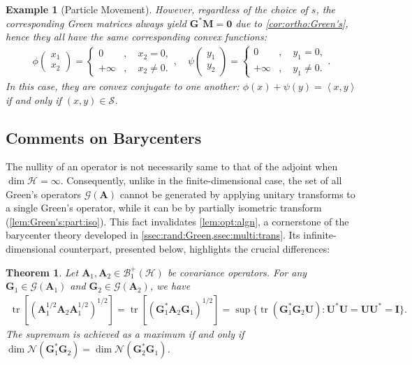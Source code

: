\documentclass[noinfoline]{imsart}\setcounter{tocdepth}{2}
\newcommand{\m}[1]{\mathbf{#1}} %
\renewcommand{\c}[1]{\mathcal{#1}} %
\newcommand{\innpr}[2]{{\left\langle {#1},{#2}\right\rangle}} %
\DeclareMathOperator*{\tr}{tr}
\theoremstyle{plain}
\newtheorem{theorem}{Theorem}[section]
\newtheorem{example}{Example}[section]
\begin{document}
\begin{example}[Particle Movement]
However, regardless of the choice of $s$, the corresponding Green matrices always yield $\m{G}^{*} \m{M} = \m{0}$ due to \cref{cor:ortho:Green's}, hence they all have the same corresponding convex functions:
\begin{align*}
    \phi \begin{pmatrix}
    x_{1} \\ x_{2}
    \end{pmatrix} = 
    \begin{cases}
        0 &, \quad x_{2} = 0, \\
        +\infty &, \quad x_{2} \ne 0. 
    \end{cases}, \quad 
    \psi \begin{pmatrix}
    y_{1} \\ y_{2}
    \end{pmatrix} = 
    \begin{cases}
        0 &, \quad y_{1} = 0, \\
        +\infty &, \quad y_{1} \ne 0. 
    \end{cases}.
\end{align*}
In this case, they are convex conjugate to one another: $\phi(x) + \psi(y) = \innpr{x}{y}$ if and only if $(x, y) \in \c{S}$.
\end{example}


\subsection{Comments on Barycenters}
The nullity of an operator is not necessarily same to that of the adjoint when $\dim \c{H} = \infty$. Consequently, unlike in the finite-dimensional case, the set of all Green's operators $\c{G}(\m{A})$ cannot be generated by applying unitary transforms to a single Green's operator, while it can be by partially isometric transform (\cref{lem:Green's:part:iso}). This fact invalidates \cref{lem:opt:algn}, a cornerstone of the barycenter theory developed in \cref{ssec:rand:Green,ssec:multi:trans}. Its infinite-dimensional counterpart, presented below, highlights the crucial differences:

\begin{theorem}\label{lem:opt:algn:inf-dim}
Let $\m{A}_{1}, \m{A}_{2} \in \c{B}_{1}^{+}(\c{H})$ be covariance operators. For any $\m{G}_{1} \in \c{G}(\m{A}_{1})$ and $\m{G}_{2} \in \c{G}(\m{A}_{2})$, we have 
\begin{align*}
    \tr [(\m{A}_{1}^{1/2} \m{A}_{2} \m{A}_{1}^{1/2})^{1/2}] = \tr [(\m{G}_{1}^{*} \m{A}_{2} \m{G}_{1})^{1/2}] =
    \sup \{\tr (\m{G}_{1}^{*} \m{G}_{2} \m{U}) : \m{U}^{*} \m{U} = \m{U} \m{U}^{*} = \m{I} \}.
\end{align*}
The supremum is achieved as a maximum if and only if $\dim \c{N}(\m{G}_{1}^{*} \m{G}_{2}) = \dim \c{N}(\m{G}_{2}^{*} \m{G}_{1})$.
\end{theorem}
\end{document}
